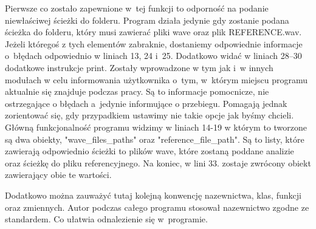 \documentclass[eng,printmode]{mgr}
\begin{document}
Pierwsze co zostało zapewnione w~tej funkcji to odporność na podanie niewłaściwej ścieżki do folderu. Program działa jedynie gdy zostanie podana ścieżka do folderu, który musi zawierać pliki wave oraz plik REFERENCE.wav. Jeżeli któregoś z tych elementów zabraknie, dostaniemy odpowiednie informacje o~błędach odpowiednio w liniach 13, 24 i~25. Dodatkowo widać w liniach 28--30 dodatkowe instrukcje print. Zostały wprowadzone w tym jak i~w innych modułach w celu informowania użytkownika o~tym, w~którym miejscu programu aktualnie się znajduje podczas pracy. Są to informacje pomocnicze, nie ostrzegające o błędach a~jedynie informujące o przebiegu. Pomagają jednak zorientować się, gdy przypadkiem ustawimy nie takie opcje jak byśmy chcieli. Główną funkcjonalność programu widzimy w liniach 14-19 w którym to tworzone są dwa obiekty, "wave\_files\_paths" oraz "reference\_file\_path". Są to listy, które zawierają odpowiednio ścieżki to plików wave, które zostaną poddane analizie oraz ścieżkę do pliku referencyjnego. Na koniec, w lini 33. zostaje zwrócony obiekt zawierający obie te  wartości.

Dodatkowo można zauważyć tutaj kolejną konwencję nazewnictwa, klas, funkcji oraz zmiennych. Autor podczas całego programu stosował nazewnictwo zgodne ze standardem\cite{PEP8}. Co ułatwia odnalezienie się w~programie.
\end{document}
